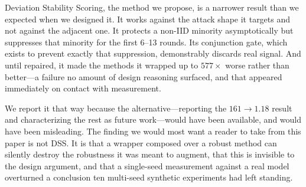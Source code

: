 \documentclass[11pt,a4paper]{article}
\begin{document}
Deviation Stability Scoring, the method we propose, is a narrower result
than we expected when we designed it. It works against the attack shape it
targets and not against the adjacent one. It protects a non-IID minority
asymptotically but suppresses that minority for the first 6--13 rounds.
Its conjunction gate, which exists to prevent exactly that suppression,
demonstrably discards real signal. And until repaired, it made the methods
it wrapped up to $577\times$ worse rather than better---a failure no
amount of design reasoning surfaced, and that appeared immediately on
contact with measurement.

We report it that way because the alternative---reporting the
$161 \rightarrow 1.18$ result and characterizing the rest as future
work---would have been available, and would have been misleading. The
finding we would most want a reader to take from this paper is not DSS.
It is that a wrapper composed over a robust method can silently destroy
the robustness it was meant to augment, that this is invisible to the
design argument, and that a single-seed measurement against a real model
overturned a conclusion ten multi-seed synthetic experiments had left
standing.
\end{document}
